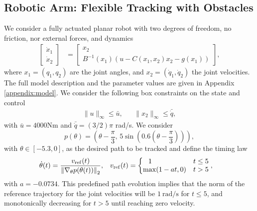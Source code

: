 \documentclass[journal]{IEEEtran}
\newcommand {\matr}[2]{\left[\begin{array}{#1}#2\end{array}\right]}
\begin{document}
	\subsection{Robotic Arm: Flexible Tracking with Obstacles}
	We consider a fully actuated planar robot with two degrees of freedom, no friction, nor external forces, and dynamics
	\begin{align}
	\matr{c}{\dot{x}_1\\\dot{x}_2} &= \matr{c}{ x_2\\B^{-1}(x_1)(u-C(x_1,x_2)x_2-g(x_1))},\label{eq:robot}
	\end{align}
	where $x_1=(q_1,q_2)$ are the joint angles, and $x_2=(\dot{q}_1,\dot{q}_2)$ the joint velocities. The full model description and the parameter values are given in Appendix \ref{appendix:model}.
	We consider the following box constraints on the state and control 
	\begin{align}\label{eq:box_constr}
	\|u\|_\infty\leq{}\bar{u}, && \|x_2\|_\infty\leq{}\bar{\dot{q}},
	\end{align}
	with $\bar{u}=4000$Nm and $\bar{\dot{q}}=(3/2)\pi$ rad/s.
	We consider
	\begin{equation}\label{eq:path}
	p(\theta)=\left (\theta-\frac{\pi}{3},\,5\sin\left (0.6 \left (\theta-\frac{\pi}{3}\right )\right )\right ),
	\end{equation}
	with $\theta\in[-5.3,0]$, as the desired path to be tracked and define the timing law 
	\begin{align*}
	\dot{\theta}(t) &= \frac{v_\mathrm{ref}(t) }{\left \| \nabla_\theta p(\theta(t))\right \|_2}, && v_\mathrm{ref}(t) = \left \{ 
	\begin{array}{@{}ll@{}}
	\phantom{-}1 & t\leq{}5\\
	\max(1-a t,0) & t>5
	\end{array}
	\right . ,
	\end{align*}
	with $a=-0.0734$. This predefined path evolution implies that the norm of the reference trajectory for the joint velocities will be  $1\ \mathrm{rad/s}$ for $t\leq{}5$, and monotonically decreasing for $t>5$ until reaching zero velocity.
	
\end{document}
